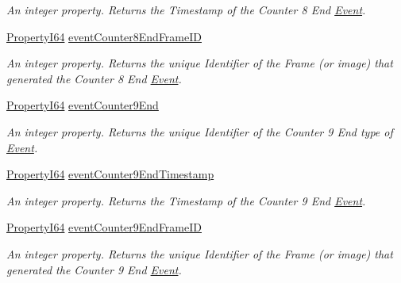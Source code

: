\begin{DoxyCompactItemize}
\begin{DoxyCompactList}\small\item\em An integer property. Returns the Timestamp of the Counter 8 End \hyperlink{classmv_i_m_p_a_c_t_1_1acquire_1_1_event}{Event}. \end{DoxyCompactList}\item 
\hyperlink{group___common_interface_ga81749b2696755513663492664a18a893}{Property\+I64} \hyperlink{classmv_i_m_p_a_c_t_1_1acquire_1_1_gen_i_cam_1_1_event_control_a6f0d45ee2b13509a6139f58811cfc0a4}{event\+Counter8\+End\+Frame\+I\+D}
\begin{DoxyCompactList}\small\item\em An integer property. Returns the unique Identifier of the Frame (or image) that generated the Counter 8 End \hyperlink{classmv_i_m_p_a_c_t_1_1acquire_1_1_event}{Event}. \end{DoxyCompactList}\item 
\hyperlink{group___common_interface_ga81749b2696755513663492664a18a893}{Property\+I64} \hyperlink{classmv_i_m_p_a_c_t_1_1acquire_1_1_gen_i_cam_1_1_event_control_ae3e1133cd101d5726c476dfb6684936f}{event\+Counter9\+End}
\begin{DoxyCompactList}\small\item\em An integer property. Returns the unique Identifier of the Counter 9 End type of \hyperlink{classmv_i_m_p_a_c_t_1_1acquire_1_1_event}{Event}. \end{DoxyCompactList}\item 
\hyperlink{group___common_interface_ga81749b2696755513663492664a18a893}{Property\+I64} \hyperlink{classmv_i_m_p_a_c_t_1_1acquire_1_1_gen_i_cam_1_1_event_control_ab38fc4734afdb20ff0a3a76249e1d68e}{event\+Counter9\+End\+Timestamp}
\begin{DoxyCompactList}\small\item\em An integer property. Returns the Timestamp of the Counter 9 End \hyperlink{classmv_i_m_p_a_c_t_1_1acquire_1_1_event}{Event}. \end{DoxyCompactList}\item 
\hyperlink{group___common_interface_ga81749b2696755513663492664a18a893}{Property\+I64} \hyperlink{classmv_i_m_p_a_c_t_1_1acquire_1_1_gen_i_cam_1_1_event_control_a425b880d8d2b39d835aba748a8fa5f2d}{event\+Counter9\+End\+Frame\+I\+D}
\begin{DoxyCompactList}\small\item\em An integer property. Returns the unique Identifier of the Frame (or image) that generated the Counter 9 End \hyperlink{classmv_i_m_p_a_c_t_1_1acquire_1_1_event}{Event}. \end{DoxyCompactList}\item 

\end{DoxyCompactItemize}
